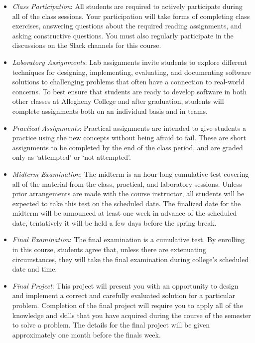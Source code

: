 \begin{itemize}

  \item {\em Class Participation}: All students are required to actively participate
    during all of the class sessions. Your participation will take forms of completing class exercises, answering questions about the required reading assignments, and asking constructive questions. You must also
    regularly participate in the discussions on the Slack channels for this course.
  \item {\em Laboratory Assignments}: Lab assignments invite students to explore different techniques for designing,
    implementing, evaluating, and documenting software solutions to challenging problems that often have a connection to
    real-world concerns.  To best ensure that students are ready to develop software in both other classes at
    Allegheny College and after graduation, students will complete assignments both on an individual basis and in teams.
  \item {\em Practical Assignments}: Practical assignments are intended to give students a practice using the new concepts without being afraid to fail. These are short assignments to be completed by the end of the class period, and are graded only as `attempted' or `not attempted'. 
  \item {\em Midterm Examination}: The midterm is an hour-long cumulative test covering all of the material from the
    class, practical, and laboratory sessions. Unless prior arrangements are made with the course instructor, all
    students will be expected to take this test on the scheduled date. The finalized date for the midterm will be announced at least one week in advance of the scheduled date, tentatively it will be held a few days before the spring break. 
  \item {\em Final Examination}: The final examination is a cumulative test.  By enrolling in this
    course, students agree that, unless there are extenuating circumstances, they will take the final examination
   during college's scheduled date and time.
  \item {\em Final Project}: This project will present you with an opportunity to design
    and implement a correct and carefully evaluated solution for a particular problem. Completion of the final project will require you to apply all of the knowledge and skills that you have acquired during the course of the semester to solve a problem. The details for the final project will be given approximately one month before the finals week.
\end{itemize}


